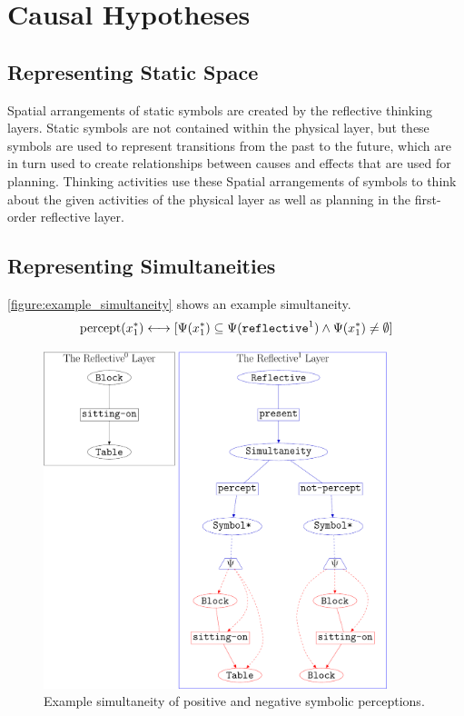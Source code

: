 \chapter{Causal Hypotheses}
\label{chapter:causal_hypotheses}

\section{Representing Static Space}

Spatial arrangements of static symbols are created by the reflective
thinking layers.  Static symbols are not contained within the physical
layer, but these symbols are used to represent transitions from the
past to the future, which are in turn used to create relationships
between causes and effects that are used for planning.  Thinking
activities use these Spatial arrangements of symbols to think about
the given activities of the physical layer as well as planning in the
first-order reflective layer.

\section{Representing Simultaneities}

{\mbox{\autoref{figure:example_simultaneity}}} shows an example
simultaneity.
\begin{equation}
\text{percept}(x_1^*) \longleftrightarrow [\Psi(x_1^*) \subseteq \Psi(\text{\tt{reflective}}^1) \wedge \Psi(x_1^*) \neq \emptyset]
\end{equation}
\begin{figure}
\center
\includegraphics[width=10cm]{gfx/example_simultaneity}
\caption{Example simultaneity of positive and negative symbolic perceptions.}
\label{figure:example_simultaneity}
\end{figure}

